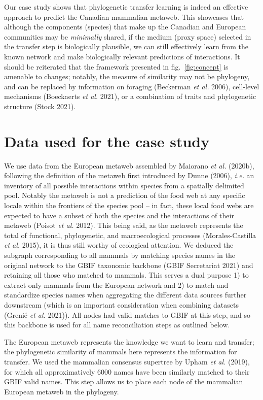 \documentclass[11pt]{article}
\begin{document}
Our case study shows that phylogenetic transfer learning is indeed an
effective approach to predict the Canadian mammalian metaweb. This
showcases that although the components (species) that make up the
Canadian and European communities may be \emph{minimally} shared, if the
medium (proxy space) selected in the transfer step is biologically
plausible, we can still effectively learn from the known network and
make biologically relevant predictions of interactions. It should be
reiterated that the framework presented in fig.~\ref{fig:concept} is
amenable to changes; notably, the measure of similarity may not be
phylogeny, and can be replaced by information on foraging (Beckerman
\emph{et al.} 2006), cell-level mechanisms (Boeckaerts \emph{et al.}
2021), or a combination of traits and phylogenetic structure (Stock
2021).

\hypertarget{data-used-for-the-case-study}{%
\section{Data used for the case
study}\label{data-used-for-the-case-study}}

We use data from the European metaweb assembled by Maiorano \emph{et
al.} (2020b), following the definition of the metaweb first introduced
by Dunne (2006), \emph{i.e.} an inventory of all possible interactions
within species from a spatially delimited pool. Notably the metaweb is
not a prediction of the food web at any specific locale within the
frontiers of the species pool -- in fact, these local food webs are
expected to have a subset of both the species and the interactions of
their metaweb (Poisot \emph{et al.} 2012). This being said, as the
metaweb represents the total of functional, phylogenetic, and
macroecological processes (Morales-Castilla \emph{et al.} 2015), it is
thus still worthy of ecological attention. We deduced the subgraph
corresponding to all mammals by matching species names in the original
network to the GBIF taxonomic backbone (GBIF Secretariat 2021) and
retaining all those who matched to mammals. This serves a dual purpose
1) to extract only mammals from the European network and 2) to match and
standardize species names when aggregating the different data sources
further downstream (which is an important consideration when combining
datasets (Grenié \emph{et al.} 2021)). All nodes had valid matches to
GBIF at this step, and so this backbone is used for all name
reconciliation steps as outlined below.

The European metaweb represents the knowledge we want to learn and
transfer; the phylogenetic similarity of mammals here represents the
information for transfer. We used the mammalian consensus supertree by
Upham \emph{et al.} (2019), for which all approximatively 6000 names
have been similarly matched to their GBIF valid names. This step allows
us to place each node of the mammalian European metaweb in the
phylogeny.
\end{document}
